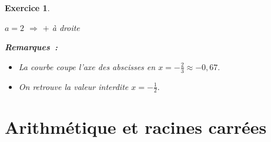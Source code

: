 \documentclass[10pt]{article}
\newtheorem{exo}{Exercice}
\begin{document}
\begin{exo}
\begin{enumerate}
\begin{multicols}{2}
 $a=2$ $\Rightarrow$ $+$ à droite
\end{multicols}

\medskip



\begin{center}
\end{center}
\end{enumerate}

\medskip

\textbf{Remarques~:}

\begin{itemize}
\item[\textbullet] La courbe coupe l'axe des abscisses en $x=-\frac{2}{3}\approx -0,67.$
\item[\textbullet] On retrouve la valeur interdite $x=-\frac{1}{2}.$
\end{itemize}
\end{exo}

\setcounter{section}{11}




\section{Arithmétique et racines carrées}

\setcounter{exo}{143}
\end{document}
